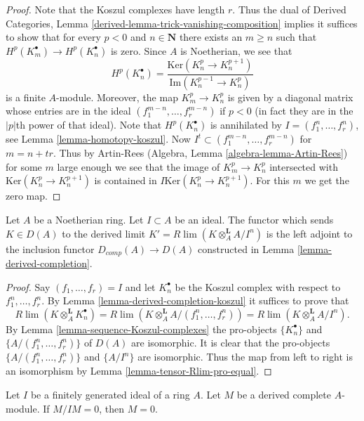 \begin{proof}
Note that the Koszul complexes have length $r$. Thus the dual of
Derived Categories, Lemma \ref{derived-lemma-trick-vanishing-composition}
implies it suffices to show that for every $p < 0$ and $n \in \mathbf{N}$
there exists an $m \geq n$ such that $H^p(K_m^\bullet) \to H^p(K_n^\bullet)$
is zero. Since $A$ is Noetherian, we see that
$$
H^p(K_n^\bullet) =
\frac{\text{Ker}(K_n^p \to K_n^{p + 1})}{\text{Im}(K_n^{p - 1} \to K_n^p)}
$$
is a finite $A$-module. Moreover, the map $K_m^p \to K_n^p$ is given
by a diagonal matrix whose entries are in the ideal
$(f_1^{m - n}, \ldots, f_r^{m - n})$ if $p < 0$ (in fact they are in the
$|p|$th power of that ideal). Note that $H^p(K_n^\bullet)$ is annihilated by
$I = (f_1^n, \ldots, f_r^n)$, see Lemma \ref{lemma-homotopy-koszul}. Now
$I^t \subset (f_1^{m - n}, \ldots, f_r^{m - n})$ for $m = n + tr$.
Thus by Artin-Rees (Algebra, Lemma \ref{algebra-lemma-Artin-Rees})
for some $m$ large enough we see that
the image of $K_m^p \to K_n^p$ intersected with
$\text{Ker}(K_n^p \to K_n^{p + 1})$ is contained in
$I \text{Ker}(K_n^p \to K_n^{p + 1})$. For this $m$ we get the zero map.
\end{proof}

\begin{proposition}
\label{proposition-noetherian-naive-completion-is-completion}
Let $A$ be a Noetherian ring. Let $I \subset A$ be an ideal.
The functor which sends $K \in D(A)$ to the derived limit
$K' = R\lim( K \otimes_A^\mathbf{L} A/I^n )$ is the left
adjoint to the inclusion functor $D_{comp}(A) \to D(A)$
constructed in Lemma \ref{lemma-derived-completion}.
\end{proposition}

\begin{proof}
Say $(f_1, \ldots, f_r) = I$ and let $K_n^\bullet$ be the Koszul complex
with respect to $f_1^n, \ldots, f_r^n$. By
Lemma \ref{lemma-derived-completion-koszul}
it suffices to prove that
$$
R\lim (K \otimes_A^\mathbf{L} K_n^\bullet) =
R\lim (K \otimes_A^\mathbf{L} A/(f_1^n, \ldots, f_r^n) ) =
R\lim (K \otimes_A^\mathbf{L} A/I^n ).
$$
By Lemma \ref{lemma-sequence-Koszul-complexes} the pro-objects
$\{K_n^\bullet\}$ and $\{A/(f_1^n, \ldots, f_r^n)\}$ of $D(A)$ are
isomorphic. It is clear that the pro-objects
$\{A/(f_1^n, \ldots, f_r^n)\}$ and $\{A/I^n\}$ are isomorphic.
Thus the map from left to right is an isomorphism by
Lemma \ref{lemma-tensor-Rlim-pro-equal}.
\end{proof}

\begin{lemma}
\label{lemma-derived-complete-zero}
Let $I$ be a finitely generated ideal of a ring $A$.
Let $M$ be a derived complete $A$-module.
If $M/IM = 0$, then $M = 0$.
\end{lemma}

